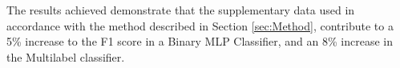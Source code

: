\documentclass{UoNMCHA}
\numberwithin{equation}{section}
\begin{document}


% 


The results achieved demonstrate that the supplementary data used in accordance with the method described in Section \ref{sec:Method}, contribute to a 5\% increase to the F1 score in a Binary MLP Classifier, and an 8\% increase in the Multilabel classifier.
\end{document}
